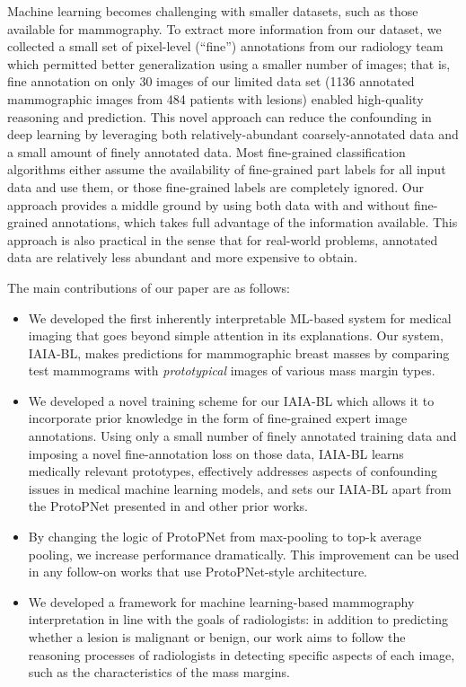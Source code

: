 \documentclass[11pt]{article}
\begin{document}
Machine learning becomes challenging with smaller datasets, such as those available for mammography. To extract more information from our dataset, we collected a small set of pixel-level (``fine'') annotations from our radiology team which permitted better generalization using a smaller number of images; that is, fine annotation on only 30 images of our limited data set (1136 annotated mammographic images from 484 patients with lesions) enabled high-quality reasoning and prediction. This novel approach can reduce the confounding in deep learning by leveraging both relatively-abundant coarsely-annotated data and a small amount of finely annotated data. Most fine-grained classification algorithms either assume the availability of fine-grained part labels for all input data and use them, or those fine-grained labels are completely ignored. Our approach provides a middle ground by using both data with and without fine-grained annotations, which takes full advantage of the information available. This approach is also practical in the sense that for real-world problems, annotated data are relatively less abundant and more expensive to obtain.

The main contributions of our paper are as follows: 
\begin{itemize}

    \item We developed the first inherently interpretable ML-based system for medical imaging that goes beyond simple attention in its explanations. Our system, IAIA-BL, makes predictions for mammographic breast masses by comparing test mammograms with \textit{prototypical} images of various mass margin types. 
    
    \item We developed a novel training scheme for our IAIA-BL which allows it to incorporate prior knowledge in the form of fine-grained expert image annotations. Using only a small number of finely annotated training data and imposing a novel fine-annotation loss on those data, IAIA-BL learns medically relevant prototypes, effectively addresses aspects of confounding issues in medical machine learning models, and sets our IAIA-BL apart from the ProtoPNet presented in \cite{PPNet} and other prior works.
    
    \item By changing the logic of ProtoPNet from max-pooling to top-k average pooling, we increase performance dramatically. This improvement can be used in any follow-on works that use ProtoPNet-style architecture.
    
    \item We developed a framework for machine learning-based mammography interpretation in line with the goals of radiologists: in addition to predicting whether a lesion is malignant or benign, our work aims to follow the reasoning processes of radiologists in detecting specific aspects of each image, such as the characteristics of the mass margins.
    
\end{itemize}
\end{document}
